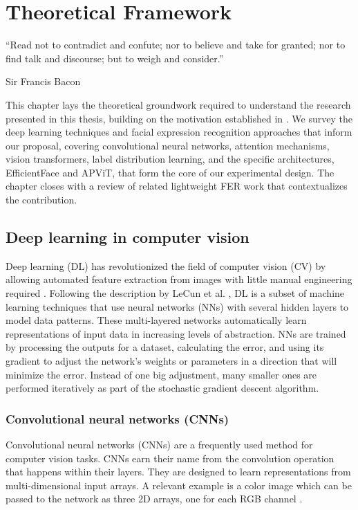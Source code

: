 \chapter{Theoretical Framework}
\label{chapter:theoretical-framework}

\epigraph{``Read not to contradict and confute; nor to believe and take for granted; nor to find talk and discourse; but to weigh and consider.''}{\vspace{10pt}Sir Francis Bacon}

\newpage

This chapter lays the theoretical groundwork required to understand the research presented in this thesis, building on the motivation established in . We survey the deep learning techniques and facial expression recognition approaches that inform our proposal, covering convolutional neural networks, attention mechanisms, vision transformers, label distribution learning, and the specific architectures, EfficientFace and APViT, that form the core of our experimental design. The chapter closes with a review of related lightweight FER work that contextualizes the contribution.


\section{Deep learning in computer vision} 

Deep learning (DL) has revolutionized the field of computer vision (CV) by allowing automated feature extraction from images with little manual engineering required \cite{lecun2015dl}.
Following the description by LeCun et al. \cite{lecun2015dl}, DL is a subset of machine learning techniques that use neural networks (NNs) with several hidden layers to model data patterns.
These multi-layered networks automatically learn representations of input data in increasing levels of abstraction.
NNs are trained by processing the outputs for a dataset, calculating the error, and using its gradient to adjust the network's weights or parameters
in a direction that will minimize the error.
Instead of one big adjustment, many smaller ones are performed iteratively as part of the stochastic gradient descent algorithm.

\subsection{Convolutional neural networks (CNNs)}

Convolutional neural networks (CNNs) are a frequently used method for computer vision tasks.
CNNs earn their name from the convolution operation that happens within their layers.
They are designed to learn representations from multi-dimensional input arrays.
A relevant example is a color image which can be passed to the network as three 2D arrays, one for each RGB channel \cite{lecun2015dl}.\\

